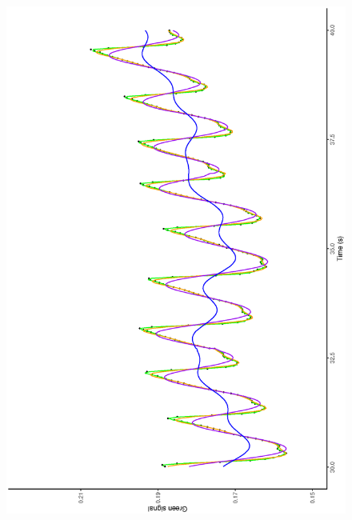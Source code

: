 \documentclass[twocolumn]{bmcart}%
\begin{document}
\begin{figure}[p]
\begin{center}
{{           		  	  \includegraphics[width =\linewidth,angle=270]{pes1d3}
        	                 }
        			\subfigure[]{
         		            \label{fig:pues1d3}
}}
\end{center}
\end{figure}
\end{document}
